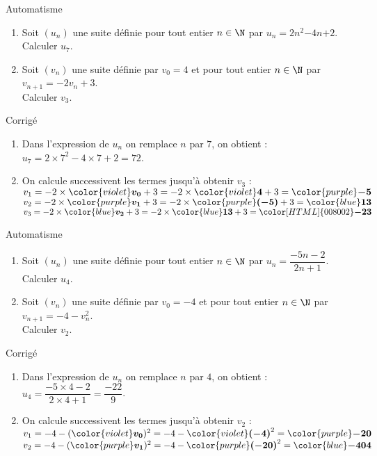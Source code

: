 \documentclass[a4paper,11pt,exos]{nsi} %
\newcounter{autNum}
\newcommand{\aut}[1]
{
	\addtocounter{autNum}{1}
	{\titlefont\color{UGLiBlue}\Large Automatisme\ \theautNum\ \normalsize{#1}}\smallskip	
}
\newcounter{corNum}
\newcommand{\cor}[1]
{
	\addtocounter{corNum}{1}
	{\titlefont\color{UGLiOrange}\Large Corrigé\ \thecorNum\ \normalsize{#1}}\smallskip	
}
\begin{document}
\maketitle

\aut{}
\begin{enumerate}
    \item %
    Soit $(u_n)$ une suite définie pour tout entier $n\in\N$ par $u_n = 2n^2$$-4n$$+2$.\\Calculer $u_{7}$.
    \item %
    Soit $(v_n)$ une suite définie par $v_0=4$ et pour tout entier $n\in\N$ par $v_{n+1} = -2 v_n +3$.\\Calculer $v_{3}$.
\end{enumerate}

\cor{}
\begin{enumerate}
    \item  Dans l'expression de $u_n$ on remplace $n$ par $7$, on obtient : $u_{7} = 2\times 7^2-4\times 7+2=72$.
    \item On calcule successivent les termes jusqu'à obtenir $v_3$ :\\ $v_{1} = -2\times {\color{violet}\boldsymbol{v_{0}}} +3=-2 \times {\color{violet}\boldsymbol{4}} +3 =
    {\color{purple}\boldsymbol{-5}}$\\ $v_{2} = -2\times {\color{purple}\boldsymbol{v_{1}}} +3=-2 \times {\color{purple}\boldsymbol{(-5)}} +3 =
    {\color{blue}\boldsymbol{13}}$\\ $v_{3} = -2\times {\color{blue}\boldsymbol{v_{2}}} +3=-2 \times {\color{blue}\boldsymbol{13}} +3 =
    {\color[HTML]{008002}\boldsymbol{-23}}$
\end{enumerate}    

\vspace*{.5cm}

\aut{}
\begin{enumerate}
    \item Soit $(u_n)$ une suite définie pour tout entier $n\in\N$ par $u_n = \dfrac{-5n-2}{2n+1}$.\\Calculer $u_{4}$.
    \item  Soit $(v_n)$ une suite définie par $v_0=-4$ et pour tout entier $n\in\N$ par $v_{n+1} = -4 - v_n^2$.\\Calculer $v_{2}$.
\end{enumerate}

\cor{}
\begin{enumerate}
    \item Dans l'expression de $u_n$ on remplace $n$ par $4$, on obtient : $u_{4} = \dfrac{-5\times 4 -2}{2\times 4
    +1} = \dfrac{-22}{9}$.
    \item On calcule successivent les termes jusqu'à obtenir $v_2$ :\\ $v_{1} = -4 - ({\color{violet}\boldsymbol{v_{0}}})^2=-4 - {\color{violet}\boldsymbol{(-4)}}^2 =
    {\color{purple}\boldsymbol{-20}}$\\ $v_{2} = -4 - ({\color{purple}\boldsymbol{v_{1}}})^2=-4 - {\color{purple}\boldsymbol{(-20)}}^2 =
    {\color{blue}\boldsymbol{-404}}$
\end{enumerate}
\end{document}
